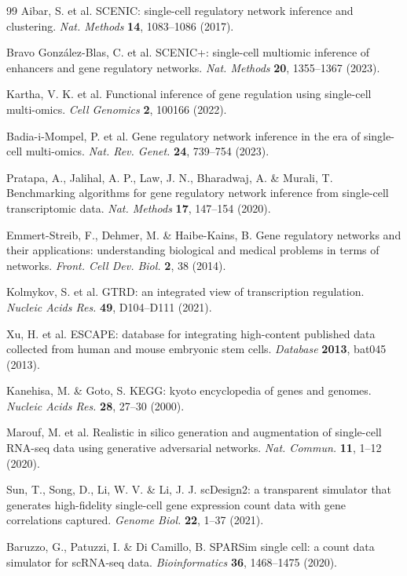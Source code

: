 \begin{singlespace}
\begin{thebibliography}{99\kern\bibindent}
Aibar, S. et al. SCENIC: single-cell regulatory network inference and
clustering. \textit{Nat. Methods} \textbf{14}, 1083–1086 (2017).

Bravo González-Blas, C. et al. SCENIC+: single-cell multiomic
inference of enhancers and gene regulatory networks. \textit{Nat. Methods} \textbf{20}, 1355–1367 (2023).

Kartha, V. K. et al. Functional inference of gene regulation using
single-cell multi-omics. \textit{Cell Genomics} \textbf{2}, 100166 (2022).

Badia-i-Mompel, P. et al. Gene regulatory network inference in the
era of single-cell multi-omics. \textit{Nat. Rev. Genet.} \textbf{24}, 739–754 (2023).

Pratapa, A., Jalihal, A. P., Law, J. N., Bharadwaj, A. \& Murali, T.
Benchmarking algorithms for gene regulatory network inference
from single-cell transcriptomic data. \textit{Nat. Methods} \textbf{17}, 147–154 (2020).

Emmert-Streib, F., Dehmer, M. \& Haibe-Kains, B. Gene regulatory
networks and their applications: understanding biological and
medical problems in terms of networks. \textit{Front. Cell Dev. Biol.} \textbf{2}, 38 (2014).

Kolmykov, S. et al. GTRD: an integrated view of transcription regulation. \textit{Nucleic Acids Res.} \textbf{49}, D104–D111 (2021).

Xu, H. et al. ESCAPE: database for integrating high-content published data collected from human and mouse embryonic stem
cells. \textit{Database} \textbf{2013}, bat045 (2013).

Kanehisa, M. \& Goto, S. KEGG: kyoto encyclopedia of genes and
genomes. \textit{Nucleic Acids Res.} \textbf{28}, 27–30 (2000).

Marouf, M. et al. Realistic in silico generation and augmentation of
single-cell RNA-seq data using generative adversarial networks.
\textit{Nat. Commun.} \textbf{11}, 1–12 (2020).

Sun, T., Song, D., Li, W. V. \& Li, J. J. scDesign2: a transparent
simulator that generates high-fidelity single-cell gene expression
count data with gene correlations captured. \textit{Genome Biol.} \textbf{22}, 1–37 (2021).

Baruzzo, G., Patuzzi, I. \& Di Camillo, B. SPARSim single cell: a count
data simulator for scRNA-seq data. \textit{Bioinformatics} \textbf{36}, 1468–1475 (2020).


\end{thebibliography}
\end{singlespace}
